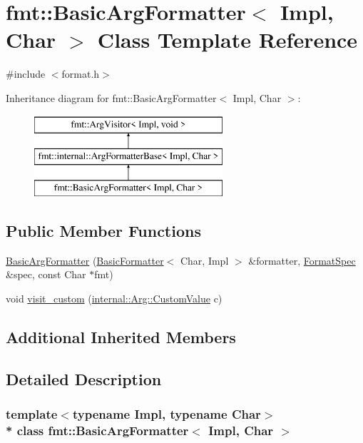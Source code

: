 \hypertarget{classfmt_1_1BasicArgFormatter}{}\section{fmt\+:\+:Basic\+Arg\+Formatter$<$ Impl, Char $>$ Class Template Reference}
\label{classfmt_1_1BasicArgFormatter}


{\ttfamily \#include $<$format.\+h$>$}

Inheritance diagram for fmt\+:\+:Basic\+Arg\+Formatter$<$ Impl, Char $>$\+:\begin{figure}[H]
\begin{center}
\leavevmode
\includegraphics[height=3.000000cm]{classfmt_1_1BasicArgFormatter}
\end{center}
\end{figure}
\subsection*{Public Member Functions}
\begin{DoxyCompactItemize}
\item 
\hyperlink{classfmt_1_1BasicArgFormatter_a207b17b258c5e16cf61ebfc9b13211d3}{Basic\+Arg\+Formatter} (\hyperlink{classfmt_1_1BasicFormatter}{Basic\+Formatter}$<$ Char, Impl $>$ \&formatter, \hyperlink{structfmt_1_1FormatSpec}{Format\+Spec} \&spec, const Char $\ast$fmt)
\item 
void \hyperlink{classfmt_1_1BasicArgFormatter_ae0aab0f90c9c93e3513203fc84c2c4dc}{visit\+\_\+custom} (\hyperlink{structfmt_1_1internal_1_1Value_1_1CustomValue}{internal\+::\+Arg\+::\+Custom\+Value} c)
\end{DoxyCompactItemize}
\subsection*{Additional Inherited Members}


\subsection{Detailed Description}
\subsubsection*{template$<$typename Impl, typename Char$>$\\*
class fmt\+::\+Basic\+Arg\+Formatter$<$ Impl, Char $>$}

